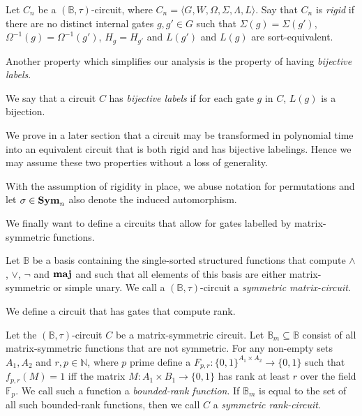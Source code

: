 \documentclass[../paper.tex]{subfiles}
\begin{document}
\begin{definition}[Rigidity]
  Let $C_n$ be a $(\mathbb{B}, \tau)$-circuit, where $C_n = \langle G, W,
  \Omega, \Sigma, \Lambda, L\rangle$. Say that $C_n$ is \emph{rigid} if there
  are no distinct internal gates $g, g' \in G$ such that $\Sigma(g) = \Sigma
  (g')$, $\Omega^{-1}(g) = \Omega^{-1}(g')$, $H_g = H_{g'}$ and $L(g')$ and
  $L(g)$ are sort-equivalent.
\end{definition}

Another property which simplifies our analysis is the property of having
\emph{bijective labels}.

\begin{definition}
  We say that a circuit $C$ has \emph{bijective labels} if for each gate $g$ in
  $C$, $L(g)$ is a bijection.
\end{definition}

We prove in a later section that a circuit may be transformed in polynomial time
into an equivalent circuit that is both rigid and has bijective labelings. Hence
we may assume these two properties without a loss of generality.

With the assumption of rigidity in place, we abuse notation for permutations and
let $\sigma \in \text{\textbf{Sym}}_n$ also denote the induced automorphism.

We finally want to define a circuits that allow for gates labelled by
matrix-symmetric functions.

\begin{definition}
  Let $\mathbb{B}$ be a basis containing the single-sorted structured functions
  that compute $\land$, $\lor$, $\neg$ and $\text{\textbf{maj}}$ and such that all elements of
  this basis are either matrix-symmetric or simple unary. We call a
  $(\mathbb{B}, \tau)$-circuit a \emph{symmetric matrix-circuit}.
\end{definition}

We define a circuit that has gates that compute rank.
\begin{definition}
  Let the $(\mathbb{B}, \tau)$-circuit $C$ be a matrix-symmetric circuit. Let
  $\mathbb{B}_m \subseteq \mathbb{B}$ consist of all matrix-symmetric functions
  that are not symmetric. For any non-empty sets $A_1, A_2$ and $r, p \in
  \mathbb{N}$, where $p$ prime define a $F_{p,r}: \{0,1\}^{A_1 \times A_2}
  \rightarrow \{0,1\}$ such that $f_{p,r}(M) = 1$ iff the matrix $M: A_1 \times
  B_1 \rightarrow \{0,1\}$ has rank at least $r$ over the field $\mathbb{F}_p$.
  We call such a function a \emph{bounded-rank function}. If $\mathbb{B}_m$ is
  equal to the set of all such bounded-rank functions, then we call $C$ a
  \emph{symmetric rank-circuit}.
\end{definition}
\end{document}
